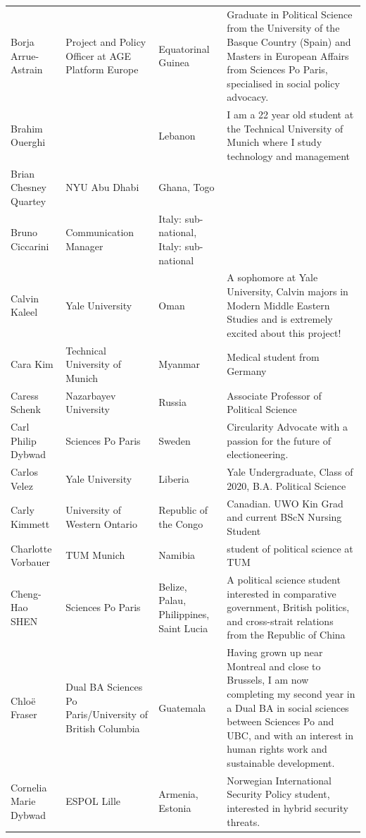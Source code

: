 \documentclass[
]{article}
\begin{document}
\begin{longtable}[t]{l>{\raggedright\arraybackslash}p{2cm}>{\raggedright\arraybackslash}p{2cm}>{\raggedright\arraybackslash}p{3cm}}
Borja Arrue-Astrain & Project and Policy Officer at AGE Platform Europe & Equatorinal Guinea & Graduate in Political Science from the University of the Basque Country (Spain) and Masters in European Affairs from Sciences Po Paris, specialised in social policy advocacy.\\
\rowcolor{gray!6}  Brahim Ouerghi &  & Lebanon & I am a 22 year old student at the Technical University of Munich where I study technology and management\\
Brian Chesney Quartey & NYU Abu Dhabi & Ghana, Togo & \\
\addlinespace
\rowcolor{gray!6}  Bruno Ciccarini & Communication Manager & Italy: sub-national, Italy: sub-national & \\
Calvin Kaleel & Yale University & Oman & A sophomore at Yale University, Calvin majors in Modern Middle Eastern Studies and is extremely excited about this project!\\
\rowcolor{gray!6}  Cara Kim & Technical University of Munich & Myanmar & Medical student from Germany\\
Caress Schenk & Nazarbayev University & Russia & Associate Professor of Political Science\\
\rowcolor{gray!6}  Carl Philip Dybwad & Sciences Po Paris & Sweden & Circularity Advocate with a passion for the future of electioneering.\\
\addlinespace
Carlos Velez & Yale University & Liberia & Yale Undergraduate, Class of 2020, B.A. Political Science\\
\rowcolor{gray!6}  Carly Kimmett & University of Western Ontario & Republic of the Congo & Canadian. UWO Kin Grad and current BScN Nursing Student\\
Charlotte Vorbauer & TUM Munich & Namibia & student of political science at TUM\\
\rowcolor{gray!6}  Cheng-Hao SHEN & Sciences Po Paris & Belize, Palau, Philippines, Saint Lucia & A political science student interested in comparative government, British politics, and cross-strait relations from the Republic of China\\
Chloë Fraser & Dual BA Sciences Po Paris/University of British Columbia & Guatemala & Having grown up near Montreal and close to Brussels, I am now completing my second year in a Dual BA in social sciences between Sciences Po and UBC, and with an interest in human rights work and sustainable development.\\
\addlinespace
\rowcolor{gray!6}  Cornelia Marie Dybwad & ESPOL Lille & Armenia, Estonia & Norwegian International Security Policy student, interested in hybrid security threats.\\

\end{longtable}
\end{document}
